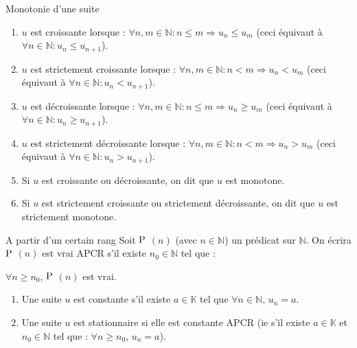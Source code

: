 \documentclass[12pt,a4paper]{report}
\begin{document}
\begin{definition}{Monotonie d'une suite}{}
\begin{enumerate}
\item $u$ est croissante lorsque : $\forall n,m \in \mathbb{N} : n \leq m \Longrightarrow u_n \leq u_m$ \newline (ceci équivaut à $\forall n \in \mathbb{N} : u_n \leq u_{n+1}$).
\item $u$ est strictement croissante lorsque : $\forall n,m \in \mathbb{N} : n < m \Longrightarrow u_n < u_m$ \newline (ceci équivaut à $\forall n \in \mathbb{N} : u_n < u_{n+1}$).
\item $u$ est décroissante lorsque : $\forall n,m \in \mathbb{N} : n \leq m \Longrightarrow u_n \geq u_m$ \newline (ceci équivaut à $\forall n \in \mathbb{N} : u_n \geq u_{n+1}$).
\item $u$ est strictement décroissante lorsque : $\forall n,m \in \mathbb{N} : n < m \Longrightarrow u_n > u_m$ \newline (ceci équivaut à $\forall n \in \mathbb{N} : u_n > u_{n+1}$).
\item Si $u$ est croissante ou décroissante, on dit que $u$ est monotone.
\item Si $u$ est strictement croissante ou strictement décroissante, on dit que $u$ est strictement monotone.
\end{enumerate}
\end{definition}

\begin{definition}{A partir d'un certain rang}{}
Soit $\rm{P}$ $(n)$ (avec $n \in \mathbb{N}$) un prédicat sur $\mathbb{N}$. On écrira $\rm{P}$ $(n)$ est vrai APCR s'il existe $n_0 \in \mathbb{N}$ tel que :
\begin{center}
$\forall n \geq n_0$, $ \rm{P}$ $(n)$ est vrai.    
\end{center} 
\end{definition}

\begin{exemple}[Exemples]
\begin{enumerate}
\item Une suite $u$ est constante s'il existe $a \in \mathbb{K}$ tel que $\forall n \in \mathbb{N}$, $u_n = a$.
\item Une suite $u$ est stationnaire si elle est constante APCR  \newline (ie s'il existe $a \in \mathbb{K}$ et $n_0 \in \mathbb{N}$ tel que : $\forall n \geq n_0$, $u_n=a$).
\end{enumerate}
\end{exemple}
\end{document}
